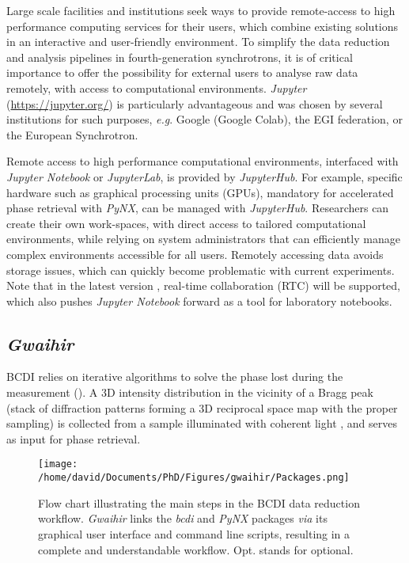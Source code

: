 Large scale facilities and institutions seek ways to provide remote-access to high performance computing services for their users, which combine existing solutions in an interactive and user-friendly environment.
To simplify the data reduction and analysis pipelines in fourth-generation synchrotrons, it is of critical importance to offer the possibility for external users to analyse raw data remotely, with access to computational environments.
\textit{Jupyter} (\url{https://jupyter.org/}) is particularly advantageous and was chosen by several institutions for such purposes, \textit{e.g}. Google (Google Colab), the EGI federation, or the European Synchrotron.

Remote access to high performance computational environments, interfaced with \textit{Jupyter Notebook} or \textit{JupyterLab}, is provided by \textit{JupyterHub}.
For example, specific hardware such as graphical processing units (GPUs), mandatory for accelerated phase retrieval with \textit{PyNX}, can be managed with \textit{JupyterHub}.
Researchers can create their own work-spaces, with direct access to tailored computational environments, while relying on system administrators that can efficiently manage complex environments accessible for all users.
Remotely accessing data avoids storage issues, which can quickly become problematic with current experiments.
Note that in the latest version \parencite{JupyterNotebook7}, real-time collaboration (RTC) will be supported, which also pushes \textit{Jupyter Notebook} forward as a tool for laboratory notebooks.

\subsection{\textit{Gwaihir}} \label{sec:Gwaihir}

BCDI relies on iterative algorithms to solve the phase lost during the measurement (\cite{Robinson2009}).
A 3D intensity distribution in the vicinity of a Bragg peak (stack of diffraction patterns forming a 3D reciprocal space map with the proper sampling) is collected from a sample illuminated with coherent light \parencite{Robinson2005}, and serves as input for phase retrieval.

\begin{figure}[!htb]
    \texttt{[image: /home/david/Documents/PhD/Figures/gwaihir/Packages.png]}
    \caption{
    Flow chart illustrating the main steps in the BCDI data reduction workflow.
    \textit{Gwaihir} links the \textit{bcdi} and \textit{PyNX} packages \textit{via} its graphical user interface and command line scripts, resulting in a complete and understandable workflow.
    Opt. stands for optional.
    }
    \label{fig:Packages}
\end{figure}

